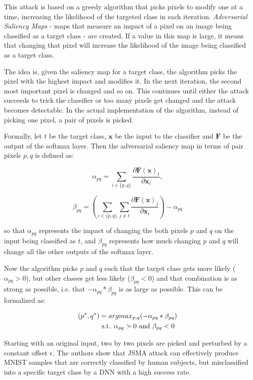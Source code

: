 This attack is based on a greedy algorithm that picks pixels to modify one at a time, increasing the likelihood of the targeted class in each iteration.  \textit{Adversarial Saliency Maps} - maps that measure an impact of a pixel on an image being classified as a target class - are created. If a value in this map is large, it means that changing that pixel will increase the likelihood of the image being classified as a target class. 

The idea is, given the saliency map for a target class, the algorithm picks the pixel with the highest impact and modifies it. In the next iteration, the second most important pixel is changed and so on. This continues until either the attack succeeds to trick the classifier or too many pixels get changed and the attack becomes detectable. In the actual implementation of the algorithm, instead of picking one pixel, a pair of pixels is picked.

Formally, let $t$ be the target class, $\pmb x$ be the input to the classifier and $\pmb F$ be the output of the softmax layer. Then the adversarial saliency map in terms of pair pixels $p, q$ is defined as:

\[
\alpha_{pq} = \sum_{i \in \{p,q\}} \frac{\partial \pmb F(\pmb x)_t}{\partial \pmb x_i},
\]

\[
\beta_{pq} = ( \sum_{i \in \{p,q\}} \sum_{j \neq t} \frac{\partial \pmb F (\pmb x)_j }{\partial \pmb x _i}) - \alpha_{pq}
\]

so that $\alpha_{pq}$ represents the impact of changing the both pixels $p$ and $q$ on the input being classified as $t$, and $\beta_{pq}$ represents how
much changing $p$ and $q$ will change all the other outputs of the softmax layer.

Now the algorithm picks $p$ and $q$ such that the target class gets more likely ($\alpha_{pq} > 0$), but other classes get less likely ($\beta_{pq} < 0$) and that combination is as strong as possible, i.e. that $ - \alpha_{pq} * \beta_{pq}$ is as large as possible. This can be formalized as:

\begin{align*}
(p^*, q^*) 
				&= arg max_{p, q} (- \alpha_{pq} * \beta_{pq}) \\
                  & \textnormal{ s.t. } \alpha_{pq} > 0 \textnormal{ and } \beta_{pq} < 0
\end{align*}


Starting with an original input, two by two pixels are picked and perturbed by a constant offset $\epsilon$. The authors \cite{DBLP:journals/corr/PapernotMJFCS15} show that JSMA attack can effectively produce MNIST samples that are correctly classified by human subjects, but misclassified into a specific target class by a DNN with a high success rate. 